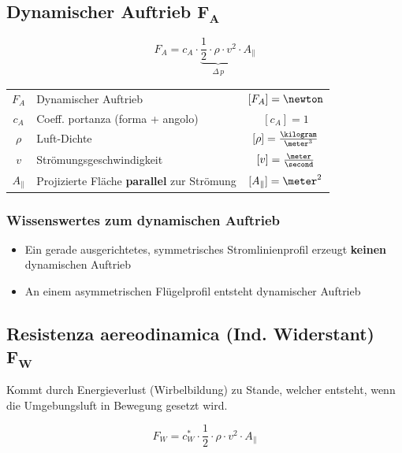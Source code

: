 \subsection[Dynamischer Auftrieb]{Dynamischer Auftrieb $\bm{F_A}$}

\vspace{-0.2cm}

\[\boxed{ F_A = c_A \cdot \underbrace{\frac{1}{2} \cdot \rho \cdot v^2 }_{\substack{\Delta \, p}} \cdot A_{\|}	} \]

\renewcommand{\arraystretch}{1.3}
\begin{tabular}{c l c}
    $F_A$       & Dynamischer Auftrieb                              & $[F_A] = \newton$                     \\
    $c_A$       & Coeff. portanza (forma + angolo)                  & $[c_A] = 1$                           \\
    $\rho$      & Luft-Dichte                                       & $[\rho] = \frac{\kilogram}{\meter^3}$ \\
    $v$         & Strömungsgeschwindigkeit                          & $[v] = \frac{\meter}{\second}$        \\
    $A_{\|}$    & Projizierte Fläche \textbf{parallel} zur Strömung & $[A_{\|}] = \meter^2$
\end{tabular}
\renewcommand{\arraystretch}{1}


\subsubsection{Wissenswertes zum dynamischen Auftrieb}

\begin{itemize}
    \item Ein gerade ausgerichtetes, symmetrisches Stromlinienprofil erzeugt \textbf{keinen} dynamischen Auftrieb
    \item An einem asymmetrischen Flügelprofil entsteht dynamischer Auftrieb 
\end{itemize}


\subsection[Induzierter Widerstand]{Resistenza aereodinamica (Ind. Widerstant) $\bm{F_W}$}

Kommt durch Energieverlust (Wirbelbildung) zu Stande, welcher entsteht, wenn die Umgebungsluft in Bewegung gesetzt wird.

\[\boxed{ F_W = c^*_W \cdot \frac{1}{2} \cdot \rho \cdot v^2 \cdot A_{\|} } \]


